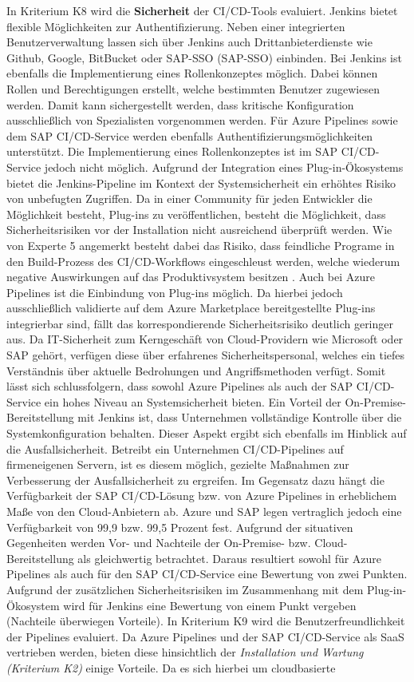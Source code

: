 In Kriterium K8 wird die \textbf{Sicherheit} der CI/CD-Tools evaluiert. Jenkins bietet flexible Möglichkeiten zur Authentifizierung. Neben einer integrierten Benutzerverwaltung lassen sich über Jenkins auch Drittanbieterdienste wie Github, Google, BitBucket oder SAP-\acl{SSO} (SAP-\acs{SSO}) einbinden. Bei Jenkins ist ebenfalls die Implementierung eines Rollenkonzeptes möglich. Dabei können Rollen und Berechtigungen erstellt, welche bestimmten Benutzer zugewiesen werden. Damit kann sichergestellt werden, dass kritische Konfiguration ausschließlich von Spezialisten vorgenommen werden. Für Azure Pipelines sowie dem SAP CI/CD-Service werden ebenfalls Authentifizierungsmöglichkeiten unterstützt. Die Implementierung eines Rollenkonzeptes ist im SAP CI/CD-Service jedoch nicht möglich. Aufgrund der Integration eines Plug-in-Ökosystems bietet die Jenkins-Pipeline im Kontext der Systemsicherheit ein erhöhtes Risiko von unbefugten Zugriffen. Da in einer Community für jeden Entwickler die Möglichkeit besteht, Plug-ins zu veröffentlichen, besteht die Möglichkeit, dass Sicherheitsrisiken vor der Installation nicht ausreichend überprüft werden. Wie von Experte 5 angemerkt besteht dabei das Risiko, dass feindliche Programe in den Build-Prozess des CI/CD-Workflows eingeschleust werden, welche wiederum negative Auswirkungen auf das Produktivsystem besitzen \cite[Z. 39]{SoftwareArchitektSAPDTSIntegration.}. Auch bei Azure Pipelines ist die Einbindung von Plug-ins möglich. Da hierbei jedoch ausschließlich validierte auf dem Azure Marketplace bereitgestellte Plug-ins integrierbar sind, fällt das korrespondierende Sicherheitsrisiko deutlich geringer aus. Da IT-Sicherheit zum Kerngeschäft von Cloud-Providern wie Microsoft oder SAP gehört, verfügen diese über erfahrenes Sicherheitspersonal, welches ein tiefes Verständnis über aktuelle Bedrohungen und Angriffsmethoden verfügt. Somit lässt sich schlussfolgern, dass sowohl Azure Pipelines als auch der SAP CI/CD-Service ein hohes Niveau an Systemsicherheit bieten. Ein Vorteil der On-Premise-Bereitstellung mit Jenkins ist, dass Unternehmen vollständige Kontrolle über die Systemkonfiguration behalten. Dieser Aspekt ergibt sich ebenfalls im Hinblick auf die Ausfallsicherheit. Betreibt ein Unternehmen CI/CD-Pipelines auf firmeneigenen Servern, ist es diesem möglich, gezielte Maßnahmen zur Verbesserung der Ausfallsicherheit zu ergreifen. Im Gegensatz dazu hängt die Verfügbarkeit der SAP CI/CD-Lösung bzw. von Azure Pipelines in erheblichem Maße von den Cloud-Anbietern ab. Azure und SAP legen vertraglich jedoch eine Verfügbarkeit von  99,9 bzw. 99,5 Prozent fest. Aufgrund der situativen Gegenheiten werden Vor- und Nachteile der On-Premise- bzw. Cloud-Bereitstellung als gleichwertig betrachtet. Daraus resultiert sowohl für Azure Pipelines als auch für den SAP CI/CD-Service eine Bewertung von zwei Punkten. Aufgrund der zusätzlichen Sicherheitsrisiken im Zusammenhang mit dem Plug-in-Ökosystem wird für Jenkins eine Bewertung von einem Punkt vergeben (Nachteile überwiegen Vorteile). In Kriterium K9 wird die Benutzerfreundlichkeit der Pipelines evaluiert. Da Azure Pipelines und der SAP CI/CD-Service als SaaS vertrieben werden, bieten diese hinsichtlich der \textit{Installation und Wartung (Kriterium K2)} einige Vorteile. Da es sich hierbei um cloudbasierte 
